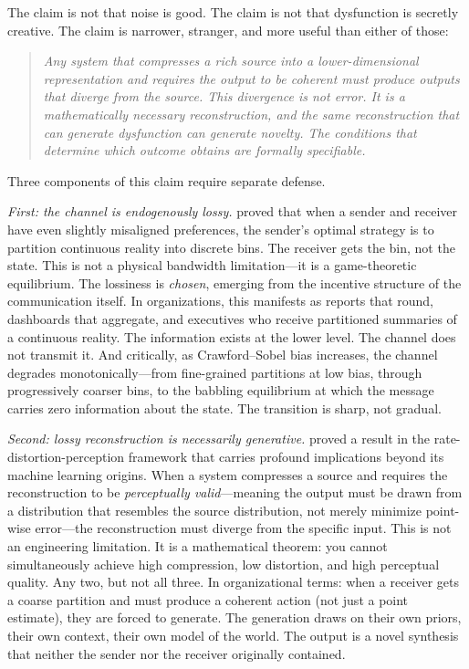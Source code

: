 \documentclass[12pt,letterpaper]{article}
\theoremstyle{definition}
\theoremstyle{remark}
\begin{document}
The claim is not that noise is good. The claim is not that dysfunction is secretly creative. The claim is narrower, stranger, and more useful than either of those:

\begin{quote}
\emph{Any system that compresses a rich source into a lower-dimensional representation and requires the output to be coherent must produce outputs that diverge from the source. This divergence is not error. It is a mathematically necessary reconstruction, and the same reconstruction that can generate dysfunction can generate novelty. The conditions that determine which outcome obtains are formally specifiable.}
\end{quote}

Three components of this claim require separate defense.

\emph{First: the channel is endogenously lossy.} \citet{crawford1982} proved that when a sender and receiver have even slightly misaligned preferences, the sender's optimal strategy is to partition continuous reality into discrete bins. The receiver gets the bin, not the state. This is not a physical bandwidth limitation---it is a game-theoretic equilibrium. The lossiness is \emph{chosen}, emerging from the incentive structure of the communication itself. In organizations, this manifests as reports that round, dashboards that aggregate, and executives who receive partitioned summaries of a continuous reality. The information exists at the lower level. The channel does not transmit it. And critically, as Crawford--Sobel bias increases, the channel degrades monotonically---from fine-grained partitions at low bias, through progressively coarser bins, to the babbling equilibrium at which the message carries zero information about the state. The transition is sharp, not gradual.

\emph{Second: lossy reconstruction is necessarily generative.} \citet{blau2018,blau2019} proved a result in the rate-distortion-perception framework that carries profound implications beyond its machine learning origins. When a system compresses a source and requires the reconstruction to be \emph{perceptually valid}---meaning the output must be drawn from a distribution that resembles the source distribution, not merely minimize point-wise error---the reconstruction must diverge from the specific input. This is not an engineering limitation. It is a mathematical theorem: you cannot simultaneously achieve high compression, low distortion, and high perceptual quality. Any two, but not all three. In organizational terms: when a receiver gets a coarse partition and must produce a coherent action (not just a point estimate), they are forced to generate. The generation draws on their own priors, their own context, their own model of the world. The output is a novel synthesis that neither the sender nor the receiver originally contained.
\end{document}
